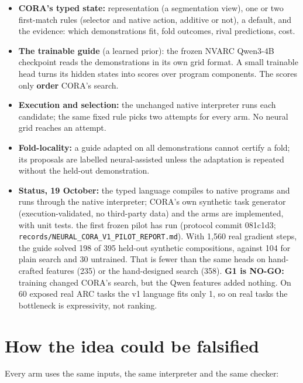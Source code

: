 \documentclass[11pt, a4paper]{article}
\begin{document}
\begin{itemize}
\item \textbf{CORA's typed state:} representation (a segmentation view), one or two first-match rules (selector and native action,
additive or not), a default, and the evidence: which demonstrations fit, fold outcomes, rival predictions, cost.
\item \textbf{The trainable guide} (a learned prior): the frozen NVARC Qwen3-4B checkpoint reads the demonstrations in its own grid format. A small
trainable head turns its hidden states into scores over program components. The scores only \textbf{order} CORA's search.
\item \textbf{Execution and selection:} the unchanged native interpreter runs each candidate; the same fixed rule picks two
attempts for every arm. No neural grid reaches an attempt.
\item \textbf{Fold-locality:} a guide adapted on all demonstrations cannot certify a fold; its proposals are labelled
neural-assisted unless the adaptation is repeated without the held-out demonstration.
\item \textbf{Status, 19 October:} the typed language compiles to native programs and runs through the native interpreter; CORA's
own synthetic task generator (execution-validated, no third-party data) and the arms are implemented, with unit tests.
the first frozen pilot has run (protocol commit 081c1d3; \texttt{records/NEURAL\_CORA\_V1\_PILOT\_REPORT.md}). With 1,560 real
gradient steps, the guide solved 198 of 395 held-out synthetic compositions, against 104 for plain search and 30
untrained. That is fewer than the same heads on hand-crafted features (235) or the hand-designed search (358).
\textbf{G1 is NO-GO:} training changed CORA's search, but the Qwen features added nothing. On 60 exposed real ARC tasks
the v1 language fits only 1, so on real tasks the bottleneck is expressivity, not ranking.
\end{itemize}

\section{How the idea could be falsified}
\label{sec-falsify}
Every arm uses the same inputs, the same interpreter and the same checker:
\end{document}

